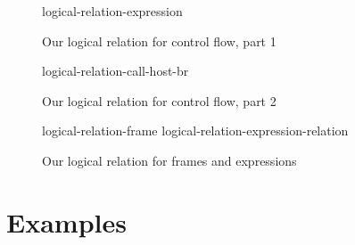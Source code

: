 \documentclass[acmsmall,screen]{acmart}\settopmatter{}
\begin{document}
\begin{figure}[t]
  {logical-relation-expression}
\label{app:fig:lrc}
\caption{Our logical relation for control flow, part 1}
\end{figure}

\begin{figure}[t]
  {logical-relation-call-host-br}
  \label{app:fig:lrb}
  \caption{Our logical relation for control flow, part 2}
\end{figure}

\begin{figure}[t]
{logical-relation-frame}
{logical-relation-expression-relation}
\label{app:fig:lre}
\caption{Our logical relation for frames and expressions}
\end{figure}


\section{Examples}





\end{document}
